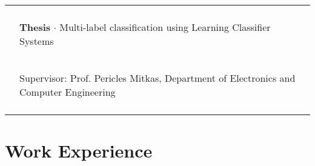 \documentclass[a4paper,10pt,twoside]{article}
\begin{document}
\begin{tabular}{rp{11cm}}
                     &\\
                     & \begin{small}\textbf{Thesis} $\cdot$ Multi-label classification using Learning Classifier Systems \end{small}\\
                     & \begin{small}Supervisor: Prof. Pericles Mitkas, Department of Electronics and Computer Engineering\end{small}\\
&\\


\end{tabular}





\section{Work Experience}
\end{document}
